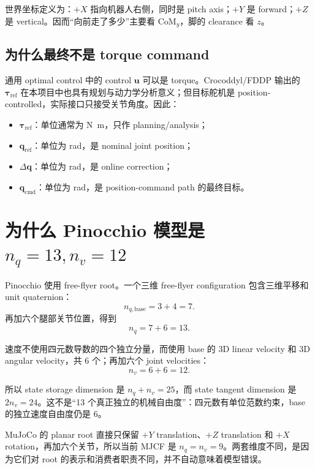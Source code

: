 \documentclass[UTF8,11pt,a4paper]{ctexart}
\begin{document}
世界坐标定义为：$+X$ 指向机器人右侧，同时是 pitch axis；$+Y$ 是 forward；$+Z$ 是 vertical。因而“向前走了多少”主要看 $\mathrm{CoM}_y$，脚的 clearance 看 $z$。

\subsection{为什么最终不是 torque command}

通用 optimal control 中的 control $\bm u$ 可以是 torque。Crocoddyl/FDDP 输出的 $\bm\tau_{\mathrm{ref}}$ 在本项目中也具有规划与动力学分析意义；但目标舵机是 position-controlled，实际接口只接受关节角度。因此：

\begin{itemize}
  \item $\bm\tau_{\mathrm{ref}}$：单位通常为 \si{\newton\metre}，只作 planning/analysis；
  \item $\bm q_{\mathrm{ref}}$：单位为 rad，是 nominal joint position；
  \item $\Delta\bm q$：单位为 rad，是 online correction；
  \item $\bm q_{\mathrm{cmd}}$：单位为 rad，是 position-command path 的最终目标。
\end{itemize}

\section{为什么 Pinocchio 模型是 \texorpdfstring{$n_q=13,n_v=12$}{nq=13,nv=12}}\label{sec:nqnv}

Pinocchio 使用 free-flyer root。一个三维 free-flyer configuration 包含三维平移和 unit quaternion：
\begin{equation}
  n_{q,\mathrm{base}}=3+4=7.
\end{equation}
再加六个腿部关节位置，得到
\begin{equation}
  n_q=7+6=13.
\end{equation}

速度不使用四元数导数的四个独立分量，而使用 base 的 3D linear velocity 和 3D angular velocity，共 6 个；再加六个 joint velocities：
\begin{equation}
  n_v=6+6=12.
\end{equation}

所以 state storage dimension 是 $n_q+n_v=25$，而 state tangent dimension 是 $2n_v=24$。这不是“13 个真正独立的机械自由度”：四元数有单位范数约束，base 的独立速度自由度仍是 6。

MuJoCo 的 planar root 直接只保留 $+Y$ translation、$+Z$ translation 和 $+X$ rotation，再加六个关节，所以当前 MJCF 是 $n_q=n_v=9$。两套维度不同，是因为它们对 root 的表示和消费者职责不同，并不自动意味着模型错误。
\end{document}
